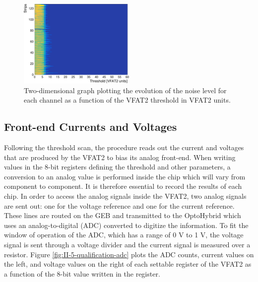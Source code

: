       \begin{figure}[h!]
        \centering
        \includegraphics[width=0.5\textwidth]{img/plots/cThreshold_Channel-crop}
        \caption{Two-dimensional graph plotting the evolution of the noise level for each channel as a function of the VFAT2 threshold in VFAT2 units.}
        \label{fig:II-5-qualification-threshold}
      \end{figure}

    \subsection{Front-end Currents and Voltages}

      Following the threshold scan, the procedure reads out the current and voltages that are produced by the VFAT2 to bias its analog front-end. When writing values in the 8-bit registers defining the threshold and other parameters, a conversion to an analog value is performed inside the chip which will vary from component to component. It is therefore essential to record the results of each chip. In order to access the analog signals inside the VFAT2, two analog signals are sent out: one for the voltage reference and one for the current reference. These lines are routed on the GEB and transmitted to the OptoHybrid which uses an analog-to-digital (ADC) converted to digitize the information. To fit the window of operation of the ADC, which has a range of 0 V to 1 V, the voltage signal is sent through a voltage divider and the current signal is measured over a resistor. Figure \ref{fig:II-5-qualification-adc} plots the ADC counts, current values on the left, and voltage values on the right of each settable register of the VFAT2 as a function of the 8-bit value written in the register. \\

